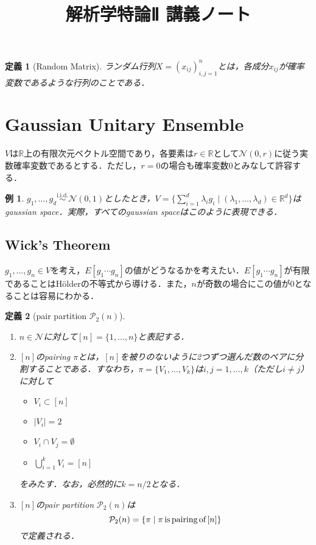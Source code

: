 \documentclass{ltjsarticle}
\title{解析学特論Ⅱ 講義ノート}
\author{}
\date{}
\theoremstyle{mystyle1}
\newtheorem{dfn}{定義}[section]
\theoremstyle{mystyle2}
\newtheorem{example}{例}
\theoremstyle{mystyle3}
\begin{document}
\maketitle

\begin{dfn}[Random Matrix]
    ランダム行列$X=(x_{ij})_{i,j=1}^n$とは，各成分$x_{ij}$が確率変数であるような行列のことである．
\end{dfn}

\section{Gaussian Unitary Ensemble}

$V$は$\mathbb{R}$上の有限次元ベクトル空間であり，各要素は$r\in\mathbb{R}$として$\mathcal{N}(0,r)$に従う実数確率変数であるとする．ただし，$r=0$の場合も確率変数$0$とみなして許容する．

\begin{example}
    $g_1,\ldots,g_d\overset{\textrm{i.i.d.}}{\sim}\mathcal{N}(0,1)$としたとき，$V=\{\sum_{i=1}^d \lambda_ig_i\mid (\lambda_1,\ldots,\lambda_d)\in\mathbb{R}^d\}$はgaussian space．実際，すべてのgaussian spaceはこのように表現できる．
\end{example}

\subsection{Wick's Theorem}

$g_1,\ldots,g_n\in V$を考え，$E[g_1\cdots g_n]$の値がどうなるかを考えたい．$E[g_1\cdots g_n]$が有限であることはHölderの不等式から導ける．また，$n$が奇数の場合にこの値が0となることは容易にわかる．

\begin{dfn}[pair partition $\mathcal{P}_2(n)$]\
    \vspace{-\baselineskip}
    \begin{enumerate}
        \item $n\in\mathcal{N}$に対して$[n]=\{1,\ldots,n\}$と表記する．
        \item $[n]$のpairing $\pi$とは，$[n]$を被りのないように2つずつ選んだ数のペアに分割することである．すなわち，$\pi=\{V_1,\ldots,V_k\}$は$i,j=1,\ldots,k$（ただし$i\neq j$）に対して
              \begin{itemize}
                  \item $V_i\subset [n]$
                  \item $|V_i|=2$
                  \item $V_i\cap V_j=\emptyset$
                  \item $\bigcup_{i=1}^k V_i=[n]$
              \end{itemize}
              をみたす．なお，必然的に$k=n/2$となる．
        \item $[n]$のpair partition $\mathcal{P}_2(n)$は
              \begin{equation}
                  \mathcal{P}_2(n)=\{\pi\mid\pi\textrm{\,is\,pairing\,of\,}[n]\}
              \end{equation}
              で定義される．
    \end{enumerate}
\end{dfn}
\end{document}
